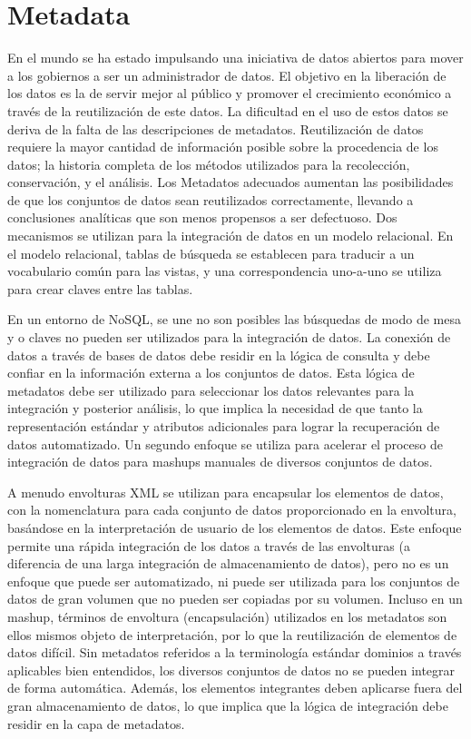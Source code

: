 \documentclass[journal]{IEEEtran}
\begin{document}
\section{Metadata}
En el mundo se ha estado impulsando una iniciativa de datos abiertos para mover a los gobiernos a ser un administrador de datos. El objetivo en la liberación de los datos es la de servir mejor al público y promover el crecimiento económico a través de la reutilización de este datos. La dificultad en el uso de estos datos se deriva de la falta de las descripciones de metadatos. Reutilización de datos requiere la mayor cantidad de información posible sobre la procedencia de los datos; la historia completa de los métodos utilizados para la recolección, conservación, y el análisis. Los Metadatos adecuados aumentan las posibilidades de que los conjuntos de datos sean reutilizados correctamente, llevando a conclusiones analíticas que son menos propensos a ser defectuoso. Dos mecanismos se utilizan para la integración de datos en un modelo relacional. En el modelo relacional, tablas de búsqueda se establecen para traducir a un vocabulario común para las vistas, y una correspondencia uno-a-uno se utiliza para crear claves entre las tablas.

En un entorno de NoSQL, se une no son posibles las búsquedas de modo de mesa y o claves no pueden ser utilizados para la integración de datos. La conexión de datos a través de bases de datos debe residir en la lógica de consulta y debe confiar en la información externa a los conjuntos de datos. Esta lógica de metadatos debe ser utilizado para seleccionar los datos relevantes para la integración y posterior análisis, lo que implica la necesidad de que tanto la representación estándar y atributos adicionales para lograr la recuperación de datos automatizado. Un segundo enfoque se utiliza para acelerar el proceso de integración de datos para mashups manuales de diversos conjuntos de datos.

A menudo envolturas XML se utilizan para encapsular los elementos de datos, con la nomenclatura para cada conjunto de datos proporcionado en la envoltura, basándose en la interpretación de usuario de los elementos de datos. Este enfoque permite una rápida integración de los datos a través de las envolturas (a diferencia de una larga integración de almacenamiento de datos), pero no es un enfoque que puede ser automatizado, ni puede ser utilizada para los conjuntos de datos de gran volumen que no pueden ser copiadas por su volumen. Incluso en un mashup, términos de envoltura (encapsulación) utilizados en los metadatos son ellos mismos objeto de interpretación, por lo que la reutilización de elementos de datos difícil. Sin metadatos referidos a la terminología estándar dominios a través aplicables bien entendidos, los diversos conjuntos de datos no se pueden integrar de forma automática. Además, los elementos integrantes deben aplicarse fuera del gran almacenamiento de datos, lo que implica que la lógica de integración debe residir en la capa de metadatos.
\end{document}
